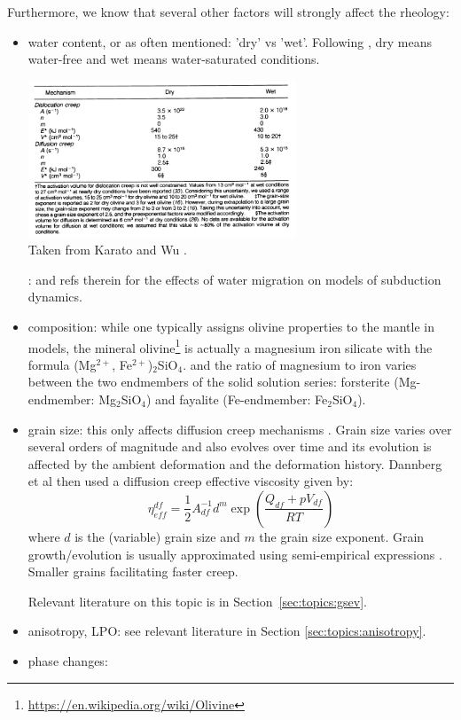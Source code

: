 Furthermore, we know that several other factors will strongly affect the rheology:
\begin{itemize}
\item water content, or as often mentioned: 'dry' vs 'wet'. Following \cite{kawu93}, 
dry means water-free and wet means water-saturated conditions.
\begin{center}
\includegraphics[width=8cm]{images/rheology/kawu93}\\
{\captionfont Taken from Karato and Wu \cite{kawu93}.}
\end{center}
\Literature: \cite{qubu14} and refs therein for the effects of water
migration on models of subduction dynamics.

\item composition: while one typically assigns olivine properties to the mantle in models, 
the mineral olivine\footnote{\url{https://en.wikipedia.org/wiki/Olivine}} 
is actually a magnesium iron silicate with the formula (Mg$^{2+}$, Fe$^{2+}$)$_2$SiO$_4$.
and the ratio of magnesium to iron varies between the two endmembers of the solid solution series: 
forsterite (Mg-endmember: Mg$_2$SiO$_4$) and fayalite (Fe-endmember: Fe$_2$SiO$_4$).

\item grain size: this only affects diffusion creep mechanisms \cite{kawu93}. 
Grain size varies over several orders of magnitude and also evolves over time and 
its evolution is affected by the ambient deformation and the deformation history.
Dannberg et al \cite{daef17} then used a diffusion creep effective viscosity 
given by:
\[
\eta_{eff}^{df} = \frac{1}{2} A_{df}^{-1} d^m \exp \left( \frac{Q_{df}+pV_{df}}{RT}  \right)
\] 
where $d$ is the (variable) grain size and $m$ the grain size exponent. Grain growth/evolution 
is usually approximated using semi-empirical expressions \cite[section~2.2]{daef17}.
Smaller grains facilitating faster creep.

Relevant literature on this topic is in Section~\ref{sec:topics:gsev}.

\item anisotropy, LPO: see relevant literature in Section \ref{sec:topics:anisotropy}.

\item phase changes: 

\end{itemize}

